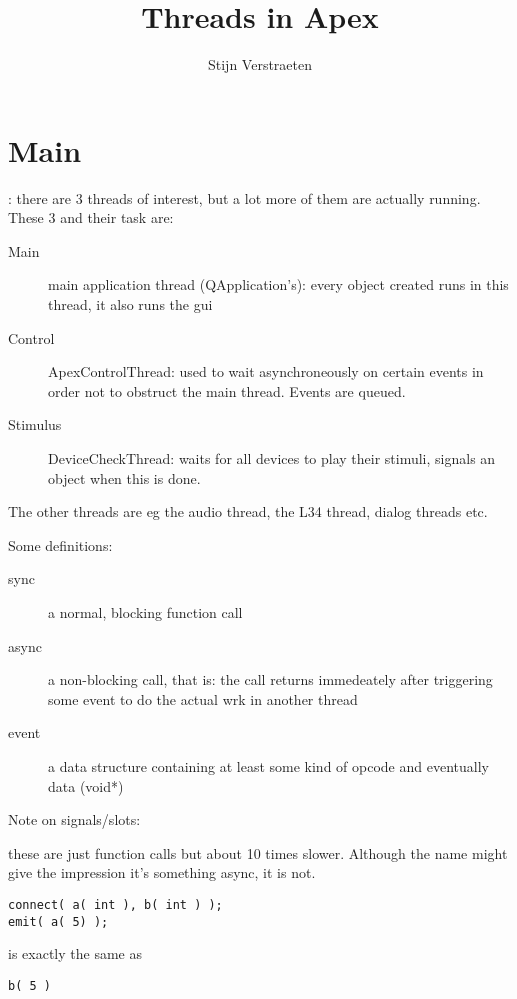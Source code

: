 \documentclass[a4paper,12pt]{article}
\title{Threads in Apex}
\author{Stijn Verstraeten}
\begin{document}
\maketitle

\tableofcontents

\section{Main}
:
there are 3 threads of interest, but a lot more of them are actually
running.
These 3 and their task are:

\begin{description}
\item[Main] main application thread (QApplication's): every object created runs in
this thread,
  it also runs the gui
\item[Control] ApexControlThread: used to wait asynchroneously on certain events in
order not to
  obstruct the main thread. Events are queued.
\item[Stimulus] DeviceCheckThread: waits for all devices to play their stimuli,
signals an object
  when this is done.
\end{description}

The other threads are eg the audio thread, the L34 thread, dialog threads etc.

Some definitions:
\begin{description}
\item[sync] a normal, blocking function call
\item[async] a non-blocking call, that is: the call returns immedeately after
triggering some event
         to do the actual wrk in another thread
\item[event] a data structure containing at least some kind of opcode and eventually
data (void*)
\end{description}

Note on signals/slots:

these are just function calls but about 10 times slower. Although the name
might give the impression it's something async, it is not.

\begin{verbatim}
connect( a( int ), b( int ) );
emit( a( 5) );
\end{verbatim}


is exactly the same as

\begin{verbatim}
b( 5 )
\end{verbatim}
\end{document}
